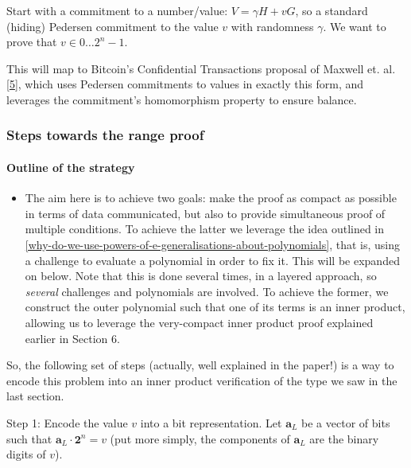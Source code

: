 \documentclass[10pt,a4paper]{article}
\providecommand{\tightlist}{%
  \setlength{\itemsep}{0pt}\setlength{\parskip}{0pt}}
\begin{document}
Start with a commitment to a number/value: $V = \gamma H + vG$, so a standard (hiding)
Pedersen commitment to the value $v$ with randomness $\gamma$. We want to prove that
$v \in {0 \ldots 2^n - 1}$.

This will map to Bitcoin's Confidential Transactions proposal of Maxwell
et. al. {[}\protect\hyperlink{anchor-2}{5}{]}, which uses Pedersen
commitments to values in exactly this form, and leverages the
commitment's homomorphism property to ensure balance.

\hypertarget{steps-towards-the-range-proof}{%
\subsubsection[Steps towards the range
proof]{\texorpdfstring{\protect\hypertarget{anchor-54}{}{}Steps towards
the range
proof}{Steps towards the range proof}}\label{steps-towards-the-range-proof}}

\hypertarget{outline-of-the-strategy}{%
\paragraph[Outline of the
strategy]{\texorpdfstring{\protect\hypertarget{anchor-55}{}{}Outline of
the strategy}{Outline of the strategy}}\label{outline-of-the-strategy}}

\begin{itemize}
\tightlist
\item
  The aim here is to achieve two goals: make the proof as compact as
  possible in terms of data communicated, but also to provide
  simultaneous proof of multiple conditions. To achieve the latter we
  leverage the idea outlined in \ref{why-do-we-use-powers-of-e-generalisations-about-polynomials}, 
  that is, using a challenge to
  evaluate a polynomial in order to fix it. This will be expanded on
  below. Note that this is done several times, in a layered approach, so
  \emph{several} challenges and polynomials are involved. To achieve the
  former, we construct the outer polynomial such that one of its terms
  is an inner product, allowing us to leverage the very-compact inner
  product proof explained earlier in Section 6.
\end{itemize}

So, the following set of steps (actually, well explained in the paper!)
is a way to encode this problem into an inner product verification of
the type we saw in the last section.

Step 1: Encode the value $v$ into a bit representation. Let $\mathbf{a}_L$ be a vector of
bits such that $\textbf{a}_L \cdot \textbf{2}^n = v$ (put more simply, the components of $\mathbf{a}_L$ are the binary digits of $v$).
\end{document}
